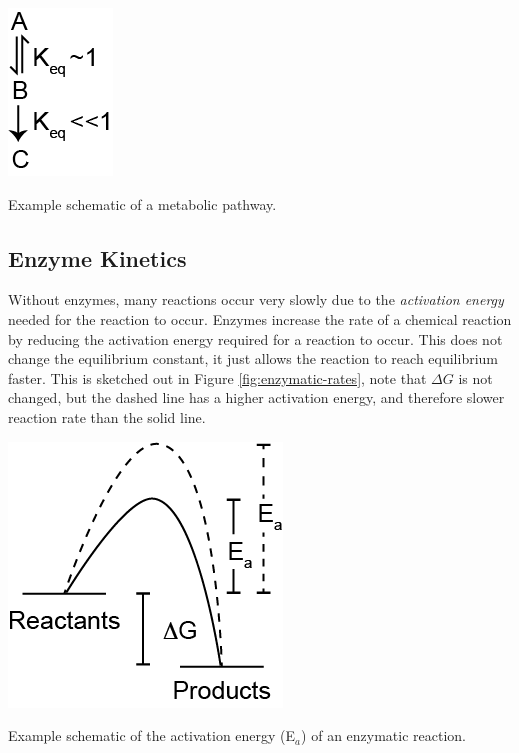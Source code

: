 \documentclass{tufte-handout}
\begin{document}
\begin{marginfigure}
\includegraphics[width=0.5\marginparwidth]{figures/committed-step.png}\
\caption{Example schematic of a metabolic pathway.}
\label{fig:committed-step}
\end{marginfigure}

\subsection{Enzyme Kinetics}

Without enzymes, many reactions occur very slowly due to the \emph{activation energy} needed for the reaction to occur.  Enzymes increase the rate of a chemical reaction by reducing the activation energy required for a reaction to occur.  This does not change the equilibrium constant, it just allows the reaction to reach equilibrium faster.  This is sketched out in Figure \ref{fig:enzymatic-rates}, note that $\Delta G$ is not changed, but the dashed line has a higher activation energy, and therefore slower reaction rate than the solid line.  

\begin{marginfigure}
\includegraphics[width=\marginparwidth]{figures/enzymatic-rates.png}\
\caption{Example schematic of the activation energy (E$_a$) of an enzymatic reaction.}
\label{fig:enzymatic-rates}
\end{marginfigure}
\end{document}
